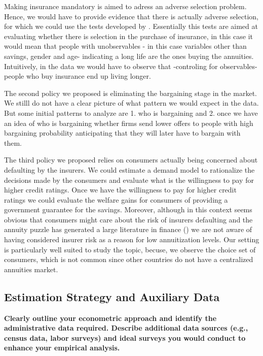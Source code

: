 \documentclass[12pt]{article}
\theoremstyle{plain}
\theoremstyle{plain}
\begin{document}
Making insurance mandatory is aimed to adress an adverse selection problem. Hence, we would have to provide evidence that there is actually adverse selection, for which we could use the tests developed by \textcite{chiappori_testing_2000,einav_estimating_2010}. Essentially this tests are aimed at evaluating whether there is selection in the purchase of insurance, in this case it would mean that people with unobservables - in this case variables other than savings, gender and age- indicating a long life are the ones buying the annuities. Intuitively, in the data we would have to observe that -controling for observables- people who buy insurance end up living longer. 

The second policy we proposed is eliminating the bargaining stage in the market. We stilll do not have a clear picture of what pattern we would expect in the data. But some initial patterns to analyze are 1. who is bargaining and 2. once we have an idea of who is bargaining whether firms send lower offers to people with high bargaining probability anticipating that they will later have to bargain with them. 

The third policy we proposed relies on consumers actually being concerned about defaulting by the insurers. We could estimate a demand model to rationalize the decisions made by the consumers and evaluate what is the willingness to pay for higher credit ratings. Once we have the willingness to pay for higher credit ratings we could evaluate the welfare gains for consumers of providing a government guarantee for the savings. Moreover, although in this context seems obvious that consumers might care about the risk of insurers defaulting and the annuity puzzle has generated a large literature in finance (\cite{benartzi_annuitization_2011}) we are not aware of having considered insurer risk as a reason for low annuitization levels. Our setting is particularly well suited to study the topic, becuse, we observe the choice set of consumers, which is not common since other countries do not have a centralized annuities market.


\subsection{ Estimation Strategy and Auxiliary Data}

\textbf{Clearly outline your econometric approach and identify the administrative data
 required. Describe additional data sources (e.g., census data, labor surveys) and ideal surveys you would conduct to enhance your empirical analysis.}
\end{document}
